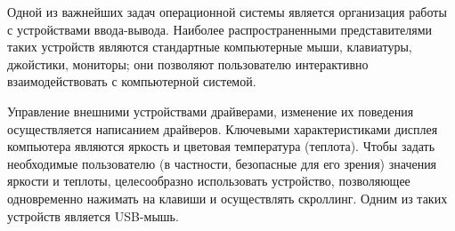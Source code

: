 
Одной из важнейших задач операционной системы является организация работы с устройствами ввода-вывода.
Наиболее распространенными представителями таких устройств являются стандартные компьютерные мыши, клавиатуры, джойстики, мониторы; они позволяют пользователю интерактивно взаимодействовать с компьютерной системой.

Управление внешними устройствами драйверами, изменение их поведения осуществляется написанием драйверов.
Ключевыми характеристиками дисплея компьютера являются яркость и цветовая температура (теплота).
Чтобы задать необходимые пользователю (в частности, безопасные для его зрения) значения яркости и теплоты, целесообразно использовать устройство, позволяющее одновременно нажимать на клавиши и осуществлять скроллинг.
Одним из таких устройств является USB-мышь.
